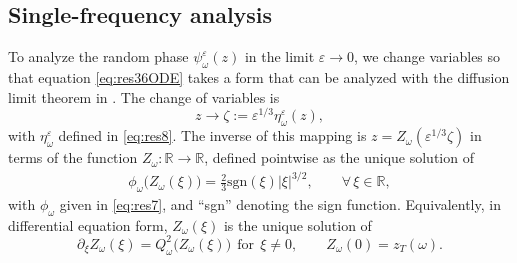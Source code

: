 \documentclass[final]{siamltex}
\begin{document}
\subsection{Single-frequency analysis}
\label{sect:proof1}
To analyze the random phase $\psi_{\omega}^{\varepsilon}(z)$ in the limit ${\varepsilon} \to
0$, we change variables so that equation \eqref{eq:res36ODE} takes a
form that can be analyzed with the diffusion limit theorem in
\cite{kim1996uniform}.  The change of variables is
\begin{equation}
z \to \zeta := {\varepsilon}^{1/3} \eta_{\omega}^{\varepsilon}(z),
\label{eq:Pr1}
\end{equation}
with $\eta_{\omega}^{\varepsilon}$ defined in \eqref{eq:res8}. The inverse of this
mapping is $z =Z_{\omega} ({\varepsilon}^{1/3}\zeta)$ in terms of the function $Z_{\omega}:\mathbb{R} \to
\mathbb{R}$, defined pointwise as the unique solution of
\begin{align}
\phi_{\omega} \big(Z_{\omega}(\xi)\big) = \frac{2}{3} \mbox{sgn}(\xi) \big| \xi
\big|^{3/2}, \qquad \forall \, \xi \in \mathbb{R}, \label{eq:Pr2}
\end{align}
with $\phi_{\omega}$ given in \eqref{eq:res7}, and ``sgn'' denoting the
sign function.  Equivalently, in differential equation form,
$Z_{\omega}(\xi)$ is the unique solution of
\begin{equation} 
\partial_\xi Z_{\omega}(\xi) = Q^2_{\omega}\big(Z_{\omega}(\xi)\big) ~ ~\mbox{for}~~ \xi \ne
0, \qquad Z_{\omega}(0) = z_T({\omega}).
\label{eq:Pr3}
\end{equation}
\end{document}
